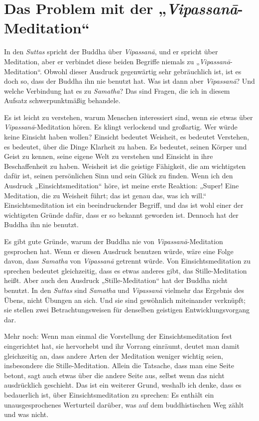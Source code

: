 \documentclass[12pt,openany]{book}
\begin{document}
\chapter*{Das Problem mit der „\textit{Vipas\-sanā}-Meditation“}

\pagestyle{fancy}

In den \textit{Suttas} spricht der Buddha über \textit{Vipas\-sanā}, und er spricht über Meditation, aber er verbindet diese beiden Begriffe niemals zu „\textit{Vipas\-sanā}-Meditation“. Obwohl dieser Ausdruck gegenwärtig sehr gebräuchlich ist, ist es doch so, dass der Buddha ihn nie benutzt hat. Was ist dann aber \textit{Vipas\-sanā}? Und welche Verbindung hat es zu \textit{Samatha}? Das sind Fragen, die ich in diesem Aufsatz schwerpunktmäßig behandele.

Es ist leicht zu verstehen, warum Menschen interessiert sind, wenn sie etwas über \textit{Vipas\-sanā}-Meditation hören. Es klingt verlockend und großartig. Wer würde keine Einsicht haben wollen? Einsicht bedeutet Weisheit, es bedeutet Verstehen, es bedeutet, über die Dinge Klarheit zu haben. Es bedeutet, seinen Körper und Geist zu kennen, seine eigene Welt zu verstehen und Einsicht in ihre Beschaffenheit zu haben. Weisheit ist die geistige Fähigkeit, die am wichtigsten dafür ist, seinen persönlichen Sinn und sein Glück zu finden. Wenn ich den Ausdruck „Einsichtsmeditation“ höre, ist meine erste Reaktion: „Super! Eine Meditation, die zu Weisheit führt; das ist genau das, was ich will.“ Einsichtsmeditation ist ein beeindruckender Begriff, und das ist wohl einer der wichtigsten Gründe dafür, dass er so bekannt geworden ist. Dennoch hat der Buddha ihn nie benutzt.

Es gibt gute Gründe, warum der Buddha nie von \textit{Vipas\-sanā}-Meditation gesprochen hat. Wenn er diesen Ausdruck benutzen würde, wäre eine Folge davon, dass \textit{Samatha} von \textit{Vipas\-sanā} getrennt würde. Von Einsichtsmeditation zu sprechen bedeutet gleichzeitig, dass es etwas anderes gibt, das Stille-Meditation heißt. Aber auch den Ausdruck „Stille-Meditation“ hat der Buddha nicht benutzt. In den \textit{Suttas} sind \textit{Samatha} und \textit{Vipas\-sanā} vielmehr das Ergebnis des Übens, nicht Übungen an sich. Und sie sind gewöhnlich miteinander verknüpft; sie stellen zwei Betrachtungsweisen für denselben geistigen Entwicklungsvorgang dar.

Mehr noch: Wenn man einmal die Vorstellung der Einsichtsmeditation fest eingerichtet hat, sie hervorhebt und ihr Vorrang einräumt, deutet man damit gleichzeitig an, dass andere Arten der Meditation weniger wichtig seien, insbesondere die Stille-Meditation. Allein die Tatsache, dass man eine Seite betont, sagt auch etwas über die andere Seite aus, selbst wenn das nicht ausdrücklich geschieht. Das ist ein weiterer Grund, weshalb ich denke, dass es bedauerlich ist, über Einsichtsmeditation zu sprechen: Es enthält ein unausgesprochenes Werturteil da\-rüber, was auf dem buddhistischen Weg zählt und was nicht.
\end{document}
